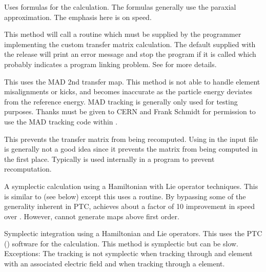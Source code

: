 \begin{description}

\item[\vn{Bmad_Standard}]
Uses formulas for the calculation. The formulas generally use the
paraxial approximation. The emphasis here is on speed.

\item[\vn{Custom}]
This method will call a routine  which must be
supplied by the programmer implementing the custom transfer matrix
calculation. The default  supplied with the
\bmad release will print an error message and stop the program if it
is called which probably indicates a program linking problem.
See  for more details.

\item[\vn{MAD}]
This uses the MAD 2nd transfer map. This method is not able to
handle element misalignments or kicks, and becomes inaccurate as the
particle energy deviates from the reference energy. MAD tracking is
generally only used for testing purposes. Thanks must be given
to CERN and Frank Schmidt for permission to use the MAD tracking code
within \bmad.

\item[\vn{Static}]
This prevents the transfer matrix from being recomputed.
Using  in the input file is generally not a good idea since
it prevents the matrix from being computed in the first place.
Typically  is used internally in a program to prevent recomputation.

\item[\vn{Symp_Lie_Bmad}]
A symplectic calculation using a Hamiltonian with Lie operator
techniques.  This is similar to  (see below) except
this uses a \bmad routine. By bypassing some of the generality
inherent in PTC,  achieves about a factor
of 10 improvement in speed over . However,
 cannot generate maps above first order.

\item[\vn{Symp_Lie_PTC}]
Symplectic integration using a Hamiltonian and Lie operators.
This uses the PTC () software for the calculation.
This method is symplectic but can be slow. Exceptions: The tracking is
not symplectic when tracking through and element with an associated electric field
and when tracking through a  element.


\end{description}
